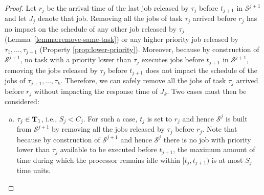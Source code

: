 \begin{proof}
Let $r_j$ be the arrival time of the last job released by $\tau_j$ before $t_{j+1}$ in $\mathcal{S}^{j+1}$ and let $J_{j}$ denote that job. %
Removing all the jobs of task $\tau_j$ arrived before $r_j$ has no impact on the schedule of any other job released by $\tau_j$ (Lemma~\ref{lemma:remove-same-task}) or any higher priority job released by $\tau_1, \ldots, \tau_{j-1}$ (Property \ref{prop:lower-priority}). Moreover, because by construction of $\mathcal{S}^{j+1}$, no task with a priority lower than $\tau_j$ executes jobs before $t_{j+1}$ in $\mathcal{S}^{j+1}$, removing the jobs released by $\tau_j$ before $t_{j+1}$ does not impact the schedule of the jobs of $\tau_{j+1}, \ldots, \tau_{k}$. Therefore, we can safely remove all the jobs of task $\tau_j$ arrived before $r_j$ without impacting the response time of $J_{k}$. Two cases must then be considered:
\begin{enumerate}[(a)]
\item $\tau_j \in {\bf T}_1$, i.e., $S_j < C_j$. For such a case, $t_{j}$ is set to $r_j$ and hence $\mathcal{S}^j$ is built from $\mathcal{S}^{j+1}$ by removing all the jobs released by $\tau_j$ before $r_j$. Note that because by construction of $\mathcal{S}^{j+1}$ and hence $\mathcal{S}^j$ there is no job with priority lower than $\tau_j$ available to be executed before $t_{j+1}$, the maximum amount of time during which the processor remains idle within $[t_j, t_{j+1})$ is at most $S_j$ time units.

\end{enumerate}
\end{proof}
